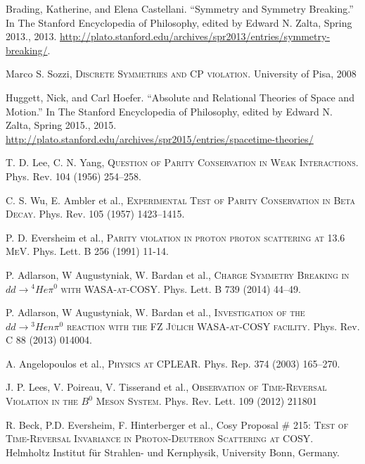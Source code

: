 \documentclass[14pt]{extarticle}
\newcommand{\SrcNm}[1]{\textsc{#1}}
\begin{document}
\pagebreak

\begin{thebibliography}{9}

Brading, Katherine, and Elena Castellani. “Symmetry and Symmetry Breaking.” In The Stanford Encyclopedia of Philosophy, edited by Edward N. Zalta, Spring 2013., 2013. \url{http://plato.stanford.edu/archives/spr2013/entries/symmetry-breaking/}.


Marco S. Sozzi,
\SrcNm{Discrete Symmetries and CP violation}.
University of Pisa,
2008

Huggett, Nick, and Carl Hoefer. “Absolute and Relational Theories of Space and Motion.” In The Stanford Encyclopedia of Philosophy, edited by Edward N. Zalta, Spring 2015., 2015. \url{http://plato.stanford.edu/archives/spr2015/entries/spacetime-theories/}


T. D. Lee, C. N. Yang,
\SrcNm{Question of Parity Conservation in Weak Interactions}.
Phys. Rev. 104 (1956) 254--258.

C. S. Wu, E. Ambler et al.,
\SrcNm{Experimental Test of Parity Conservation in Beta Decay}.
Phys. Rev. 105 (1957) 1423--1415.

P. D. Eversheim et al.,
\SrcNm{Parity violation in proton proton scattering at 13.6 MeV}.
Phys. Lett. B 256 (1991) 11-14.

P. Adlarson, W Augustyniak, W. Bardan et al.,
\SrcNm{Charge Symmetry Breaking in $dd \to {}^4He \pi^0$ with WASA-at-COSY}.
Phys. Lett. B 739 (2014) 44–49.

P. Adlarson, W Augustyniak, W. Bardan et al.,
\SrcNm{Investigation of the $dd \to {}^3He n \pi^0$ reaction with the FZ J\"{u}lich WASA-at-COSY facility}.
Phys. Rev. C 88 (2013) 014004.

A. Angelopoulos et al.,
\SrcNm{Physics at CPLEAR}. 
Phys. Rep. 374 (2003) 165--270.

J. P. Lees, V. Poireau, V. Tisserand et al.,
\SrcNm{Observation of Time-Reversal Violation in the $B^0$ Meson System}.
Phys. Rev. Lett. 109 (2012) 211801

R. Beck, P.D. Eversheim, F. Hinterberger et al.,
Cosy Proposal \# 215:
\textsc{Test of Time-Reversal Invariance in Proton-Deuteron Scattering at 
COSY}.
Helmholtz Institut für Strahlen- und Kernphysik, University Bonn, Germany.


\end{thebibliography}
\end{document}
